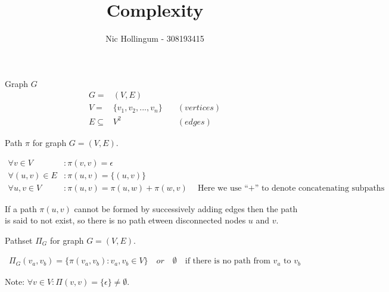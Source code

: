 \documentclass{article}
\author{Nic Hollingum - 308193415}
\title{Complexity}
\begin{document}
\begin{definition}
Graph $G$
\begin{align}
	\nonumber G = & (V,E) \\
	\nonumber V = & \{v_1, v_2, ..., v_n\} \quad & (vertices)\\
	\nonumber E \subseteq & V^2 & (edges)
\end{align}
\end{definition}

\begin{definition}
Path $\pi$ for graph $G = (V,E)$.

\begin{align}
	\nonumber \forall v \in V & : \pi(v, v) = \epsilon \\
	\nonumber \forall (u,v) \in E & : \pi(u, v) = \{(u, v)\} \\
	\nonumber \forall u, v \in V & : \pi(u, v) = \pi(u, w) + \pi(w, v) \quad \mbox{Here we use ``$+$'' to denote concatenating subpaths}
\end{align}

If a path $\pi(u, v)$ cannot be formed by successively adding edges then the path is said to not exist, so there is no path etween disconnected nodes $u$ and $v$.
\end{definition}

\begin{definition}
Pathset $\Pi_G$ for graph $G = (V,E)$.

\begin{align}
	\nonumber \Pi_G(v_a, v_b) = \{\pi(v_a, v_b) : v_a, v_b \in V\} \quad or \quad \emptyset \quad \mbox{if there is no path from $v_a$ to $v_b$}
\end{align}

Note: $\forall v \in V : \Pi(v, v) = \{\epsilon\} \neq \emptyset$.
\end{definition}
\end{document}
